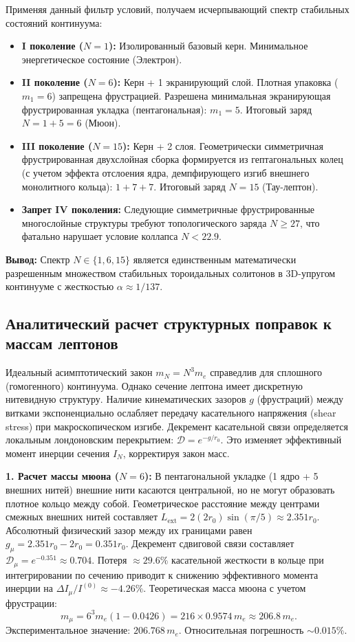 \documentclass[11pt,a4paper]{article}
\begin{document}
Применяя данный фильтр условий, получаем исчерпывающий спектр стабильных состояний континуума:
\begin{itemize}
	\item \textbf{I поколение ($N=1$):} Изолированный базовый керн. Минимальное энергетическое состояние (Электрон).
	\item \textbf{II поколение ($N=6$):} Керн + 1 экранирующий слой. Плотная упаковка ($m_1=6$) запрещена фрустрацией. Разрешена минимальная экранирующая фрустрированная укладка (пентагональная): $m_1 = 5$. Итоговый заряд $N = 1 + 5 = 6$ (Мюон).
	\item \textbf{III поколение ($N=15$):} Керн + 2 слоя. Геометрически симметричная фрустрированная двухслойная сборка формируется из гептагональных колец (с учетом эффекта отслоения ядра, демпфирующего изгиб внешнего монолитного кольца): $1 + 7 + 7$. Итоговый заряд $N = 15$ (Тау-лептон).
	\item \textbf{Запрет IV поколения:} Следующие симметричные фрустрированные многослойные структуры требуют топологического заряда $N \ge 27$, что фатально нарушает условие коллапса $N < 22.9$.
\end{itemize}

\textbf{Вывод:} Спектр $N \in \{1, 6, 15\}$ является единственным математически разрешенным множеством стабильных тороидальных солитонов в 3D-упругом континууме с жесткостью $\alpha \approx 1/137$.
	
\subsection{Аналитический расчет структурных поправок к массам лептонов}
Идеальный асимптотический закон $m_N = N^3 m_e$ справедлив для сплошного (гомогенного) континуума. Однако сечение лептона имеет дискретную нитевидную структуру. Наличие кинематических зазоров $g$ (фрустраций) между витками экспоненциально ослабляет передачу касательного напряжения (shear stress) при макроскопическом изгибе. Декремент касательной связи определяется локальным лондоновским перекрытием: $\mathcal{D} = e^{-g / r_0}$. Это изменяет эффективный момент инерции сечения $I_N$, корректируя закон масс.
	
\textbf{1. Расчет массы мюона ($N=6$):} 
В пентагональной укладке (1 ядро + 5 внешних нитей) внешние нити касаются центральной, но не могут образовать плотное кольцо между собой. Геометрическое расстояние между центрами смежных внешних нитей составляет $L_{\text{ext}} = 2(2r_0) \sin(\pi/5) \approx 2.351 r_0$. Абсолютный физический зазор между их границами равен $g_\mu = 2.351 r_0 - 2 r_0 = 0.351 r_0$. 
Декремент сдвиговой связи составляет $\mathcal{D}_\mu = e^{-0.351} \approx 0.704$. 
Потеря $\approx 29.6\%$ касательной жесткости в кольце при интегрировании по сечению приводит к снижению эффективного момента инерции на $\Delta I_\mu / I^{(0)} \approx -4.26\%$. 
Теоретическая масса мюона с учетом фрустрации:
\begin{equation}
m_\mu = 6^3 m_e (1 - 0.0426) = 216 \times 0.9574 \, m_e \approx 206.8 \, m_e.
\end{equation}
Экспериментальное значение: $206.768 \, m_e$. Относительная погрешность $\sim 0.015\%$.
	
\end{document}
